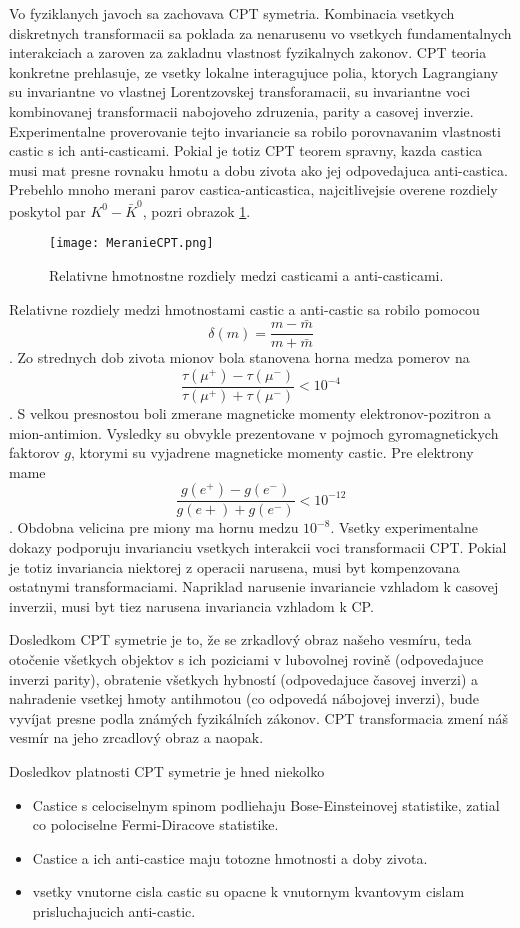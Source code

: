 \documentclass[../../main.tex]{subfiles}
\begin{document}
Vo fyziklanych javoch sa zachovava CPT symetria. Kombinacia vsetkych diskretnych transformacii sa poklada za nenarusenu vo vsetkych fundamentalnych interakciach a zaroven za zakladnu vlastnost fyzikalnych zakonov. CPT teoria konkretne prehlasuje, ze vsetky lokalne interagujuce polia, ktorych Lagrangiany su invariantne vo vlastnej Lorentzovskej transforamacii, su invariantne voci kombinovanej transformacii nabojoveho zdruzenia, parity a casovej inverzie. Experimentalne proverovanie tejto invariancie sa robilo porovnavanim vlastnosti castic s ich anti-casticami. Pokial je totiz CPT teorem spravny, kazda castica musi mat presne rovnaku hmotu a dobu zivota ako jej odpovedajuca anti-castica. Prebehlo mnoho merani parov castica-anticastica, najcitlivejsie overene rozdiely poskytol par $K^0-\bar{K}^0$, pozri obrazok \ref{sf1:fig:MeranieCPT}.
\begin{figure}[!h]
\centering
\texttt{[image: MeranieCPT.png]}
\caption{Relativne hmotnostne rozdiely medzi casticami a anti-casticami.}
\label{sf1:fig:MeranieCPT}
\end{figure} \newline
Relativne rozdiely medzi hmotnostami castic a anti-castic sa robilo pomocou $$\delta(m)=\frac{m-\bar{m}}{m+\bar{m}} $$.
Zo strednych dob zivota mionov bola stanovena horna medza pomerov na $$ \frac{\tau(\mu^+)-\tau(\mu^-)}{\tau(\mu^+)+\tau(\mu^-)}<10^{-4} $$. 
S velkou presnostou boli zmerane magneticke momenty elektronov-pozitron a mion-antimion. Vysledky su obvykle prezentovane v pojmoch gyromagnetickych faktorov $g$, ktorymi su vyjadrene magneticke momenty castic. Pre elektrony mame $$ \frac{g(e^+)-g(e^-)}{g(e+)+g(e^-)}<10^{-12} $$.
Obdobna velicina pre miony ma hornu medzu $10^{-8}$. Vsetky experimentalne dokazy podporuju invarianciu vsetkych interakcii voci transformacii CPT. Pokial je totiz invariancia niektorej z operacii narusena, musi byt kompenzovana ostatnymi transformaciami. Napriklad narusenie invariancie vzhladom k casovej inverzii, musi byt tiez narusena invariancia vzhladom k CP.\par
Dosledkom CPT symetrie je to, že se zrkadlový obraz našeho vesmíru, teda otočenie všetkych objektov s ich poziciami v lubovolnej rovině (odpovedajuce inverzi parity), obratenie všetkych hybností (odpovedajuce časovej inverzi) a nahradenie vsetkej hmoty antihmotou (co odpovedá nábojovej inverzi), bude vyvíjat presne podla známých fyzikálních zákonov. CPT transformacia zmení náš vesmír na jeho zrcadlový obraz a naopak. \par
Dosledkov platnosti CPT symetrie je hned niekolko
\begin{itemize}
	\item Castice s celociselnym spinom podliehaju Bose-Einsteinovej statistike, zatial co polociselne Fermi-Diracove statistike.
	\item Castice a ich anti-castice maju totozne hmotnosti a doby zivota.
	\item vsetky vnutorne cisla castic su opacne k vnutornym kvantovym cislam prisluchajucich anti-castic.
\end{itemize}
\end{document}
